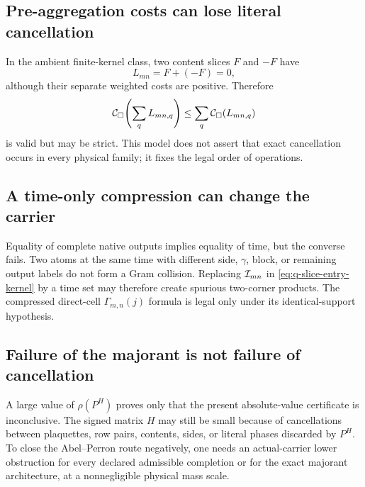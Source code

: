 \subsection{Pre-aggregation costs can lose literal cancellation}

In the ambient finite-kernel class, two content slices \(F\) and \(-F\)
have
\[
 L_{mn}=F+(-F)=0,
\]
although their separate weighted costs are positive.  Therefore
\[
 \mathcal C_\square\!\left(\sum_qL_{mn,q}\right)
 \le
 \sum_q\mathcal C_\square(L_{mn,q})
\]
is valid but may be strict.  This model does not assert that exact
cancellation occurs in every physical family; it fixes the legal order of
operations.

\subsection{A time-only compression can change the carrier}

Equality of complete native outputs implies equality of time, but the
converse fails.  Two atoms at the same time with different side,
\(\gamma\), block, or remaining output labels do not form a Gram
collision.  Replacing \(\mathcal I_{mn}\) in
\eqref{eq:q-slice-entry-kernel} by a time set may therefore create
spurious two-corner products.  The compressed direct-cell
\(\Gamma_{m,n}(j)\) formula is legal only under its identical-support
hypothesis.

\subsection{Failure of the majorant is not failure of cancellation}

A large value of \(\rho(P^H)\) proves only that the present
absolute-value certificate is inconclusive.  The signed matrix \(H\) may
still be small because of cancellations between plaquettes, row pairs,
contents, sides, or literal phases discarded by \(P^H\).  To close the
Abel--Perron route negatively, one needs an actual-carrier lower
obstruction for every declared admissible completion or for the exact
majorant architecture, at a nonnegligible physical mass scale.
